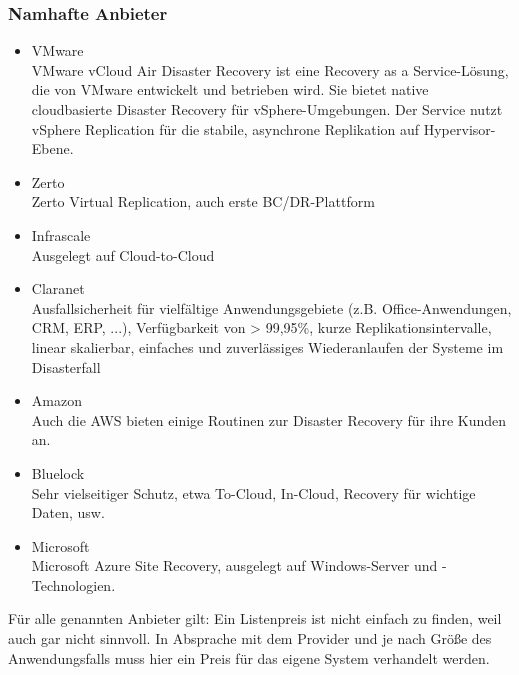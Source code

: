 \documentclass[letterpaper, 12pt]{article}
\let\tempsubsubsection\subsubsection
\renewcommand\subsubsection[1]{\vspace{0cm}\tempsubsubsection{#1}\vspace{0cm}}
\begin{document}
\clearpage

\subsubsection{Namhafte Anbieter}

\begin{itemize}
	\item VMware \\
	VMware vCloud Air Disaster Recovery ist eine Recovery as a Service-Lösung, die von VMware entwickelt und betrieben wird. Sie bietet native cloudbasierte Disaster Recovery für vSphere-Umgebungen. Der Service nutzt vSphere Replication für die stabile, asynchrone Replikation auf Hypervisor-Ebene.
	\item Zerto \\
	Zerto Virtual Replication, auch erste BC/DR-Plattform
	\item Infrascale \\
	Ausgelegt auf Cloud-to-Cloud
	\item Claranet \\
	Ausfallsicherheit für vielfältige Anwendungsgebiete (z.B. Office-Anwendungen, CRM, ERP, ...), Verfügbarkeit von > 99,95\%, kurze Replikationsintervalle, linear skalierbar, einfaches und zuverlässiges Wiederanlaufen der Systeme im Disasterfall
	\item Amazon \\
	Auch die AWS bieten einige Routinen zur Disaster Recovery für ihre Kunden an.
	\item Bluelock \\
	Sehr vielseitiger Schutz, etwa To-Cloud, In-Cloud, Recovery für wichtige Daten, usw.
	\item Microsoft \\
	Microsoft Azure Site Recovery, ausgelegt auf Windows-Server und -Technologien.
\end{itemize}

Für alle genannten Anbieter gilt: Ein Listenpreis ist nicht einfach zu finden, weil auch gar nicht sinnvoll. In Absprache mit dem Provider und je nach Größe des Anwendungsfalls muss hier ein Preis für das eigene System verhandelt werden.

\clearpage



\listoffigures
\end{document}
